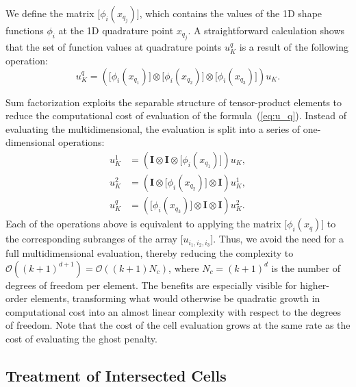 \documentclass[11pt,a4paper]{article}
\begin{document}
We define the matrix \(\bm{[}\phi_i(x_{q_j})\bm{]} \), which contains the values of the 1D shape functions \( \phi_i \)
at the 1D quadrature point \( x_{q_j} \). A straightforward calculation shows that the set of function values at
quadrature points $u_{K}^q $ is a result of the following operation:
\begin{equation}
    u_K^q = \left( \bm{[}\phi_i(x_{q_1})\bm{]} \otimes \bm{[}\phi_i(x_{q_2})\bm{]} \otimes \bm{[}\phi_i(x_{q_3})
    \bm{]} \right)u_K.
    \label{eq:u_q}
\end{equation}

Sum factorization exploits the separable structure of tensor-product elements to reduce the computational cost of
evaluation of the formula~(\ref{eq:u_q}). Instead of evaluating the multidimensional, the evaluation is split into a
series of one-dimensional operations:
\begin{align}
    u_{K}^1 & = \left( \bm{I} \otimes \bm{I} \otimes \bm{[}\phi_i(x_{q_1})\bm{]} \right) u_K  ,  \\
    u_{K}^2 & = \left( \bm{I} \otimes \bm{[}\phi_i(x_{q_2})\bm{]} \otimes \bm{I} \right) u_K^1 , \\
    u_{K}^q & = \left( \bm{[}\phi_i(x_{q_3})\bm{]} \otimes \bm{I} \otimes \bm{I} \right) u_K^2 .
\end{align}
Each of the operations above is equivalent to applying the matrix $\bm{[}\phi_i(x_q)\bm{]}$ to the
corresponding subranges of the array $\bm{[}u_{i_1,i_2,i_3}\bm{]}$. Thus, we avoid the need for a full
multidimensional evaluation, thereby
reducing the complexity to $\mathcal{O}((k+1)^{d+1}) = \mathcal{O}((k+1)     N_c)$, where $N_c = (k+1)^d$ is the number
of degrees of freedom per element. The benefits are especially visible for higher-order elements, transforming what
would otherwise be quadratic growth in computational cost into an almost linear complexity with respect to the degrees
of freedom. Note that the cost of the cell evaluation grows at the same rate as the cost of evaluating the ghost
penalty.

\subsection{Treatment of Intersected Cells}
\end{document}
